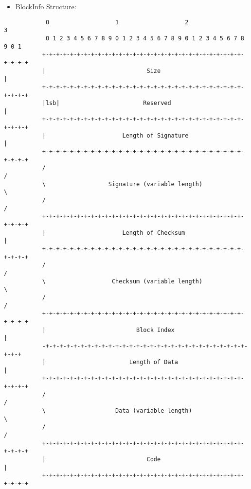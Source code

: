 \begin{itemize}
  \item BlockInfo Structure:
\end{itemize}

\begin{verbatim}
            O                   1                   2                   3
            O 1 2 3 4 5 6 7 8 9 0 1 2 3 4 5 6 7 8 9 0 1 2 3 4 5 6 7 8 9 0 1
           +-+-+-+-+-+-+-+-+-+-+-+-+-+-+-+-+-+-+-+-+-+-+-+-+-+-+-+-+-+-+-+-+
           |                             Size                              |
           +-+-+-+-+-+-+-+-+-+-+-+-+-+-+-+-+-+-+-+-+-+-+-+-+-+-+-+-+-+-+-+-+
           |lsb|                        Reserved                           |
           +-+-+-+-+-+-+-+-+-+-+-+-+-+-+-+-+-+-+-+-+-+-+-+-+-+-+-+-+-+-+-+-+
           |                      Length of Signature                      |
           +-+-+-+-+-+-+-+-+-+-+-+-+-+-+-+-+-+-+-+-+-+-+-+-+-+-+-+-+-+-+-+-+
           /                                                               /
           \                  Signature (variable length)                  \
           /                                                               /
           +-+-+-+-+-+-+-+-+-+-+-+-+-+-+-+-+-+-+-+-+-+-+-+-+-+-+-+-+-+-+-+-+
           |                      Length of Checksum                       |
           +-+-+-+-+-+-+-+-+-+-+-+-+-+-+-+-+-+-+-+-+-+-+-+-+-+-+-+-+-+-+-+-+
           /                                                               /
           \                   Checksum (variable length)                  \
           /                                                               /
           +-+-+-+-+-+-+-+-+-+-+-+-+-+-+-+-+-+-+-+-+-+-+-+-+-+-+-+-+-+-+-+-+
           |                          Block Index                          |
           -+-+-+-+-+-+-+-+-+-+-+-+-+-+-+-+-+-+-+-+-+-+-+-+-+-+-+-+-+-+-+-+
           |                        Length of Data                         |
           +-+-+-+-+-+-+-+-+-+-+-+-+-+-+-+-+-+-+-+-+-+-+-+-+-+-+-+-+-+-+-+-+
           /                                                               /
           \                    Data (variable length)                     \
           /                                                               /
           +-+-+-+-+-+-+-+-+-+-+-+-+-+-+-+-+-+-+-+-+-+-+-+-+-+-+-+-+-+-+-+-+
           |                             Code                              |
           +-+-+-+-+-+-+-+-+-+-+-+-+-+-+-+-+-+-+-+-+-+-+-+-+-+-+-+-+-+-+-+-+
\end{verbatim}

